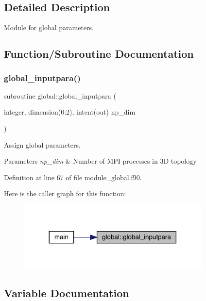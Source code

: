 \subsection{Detailed Description}
Module for global parameters. 

\subsection{Function/\+Subroutine Documentation}
\mbox{\label{namespaceglobal_a930b565da2644b675f35b91735e11ce3}} 
\subsubsection{\texorpdfstring{global\_inputpara()}{global\_inputpara()}}
{\footnotesize\ttfamily subroutine global\+::global\+\_\+inputpara (\begin{DoxyParamCaption}\item[{integer, dimension(0\+:2), intent(out)}]{np\+\_\+dim }\end{DoxyParamCaption})}



Assign global parameters. 


\begin{DoxyParams}{Parameters}
{\em np\+\_\+dim} & Number of M\+PI processes in 3D topology \\
\hline
\end{DoxyParams}


Definition at line 67 of file module\+\_\+global.\+f90.

Here is the caller graph for this function\+:
\nopagebreak
\begin{figure}[H]
\begin{center}
\leavevmode
\includegraphics[width=276pt]{namespaceglobal_a930b565da2644b675f35b91735e11ce3_icgraph}
\end{center}
\end{figure}


\subsection{Variable Documentation}
\mbox{\label{namespaceglobal_abe54a711bf9d8c30a6debfb651bdf47d}} 
